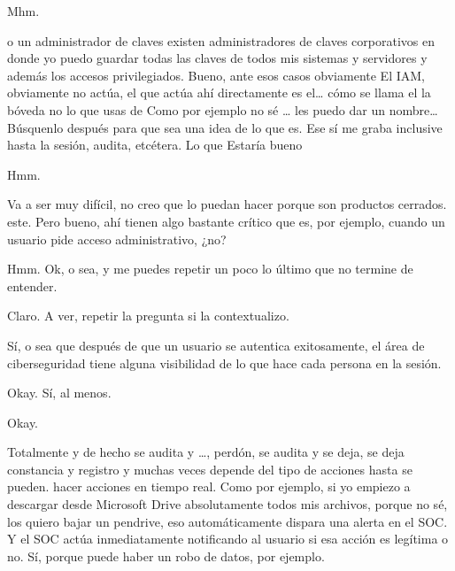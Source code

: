 \begin{description}[leftmargin=0cm, labelsep=0.5cm]
    \item[\textbf{MOCIULSKY SANTIAGO:}] Mhm.

    \item[\textbf{PEÑA ALEJANDRO FRANCISCO:}] o un administrador de claves existen administradores de claves corporativos en donde yo puedo guardar todas las claves de todos mis sistemas y servidores y además los accesos privilegiados. Bueno, ante esos casos obviamente El IAM, obviamente no actúa, el que actúa ahí directamente es el… cómo se llama el la bóveda no lo que usas de Como por ejemplo no sé … les puedo dar un nombre… Búsquenlo después para que sea una idea de lo que es. Ese sí me graba inclusive hasta la sesión, audita, etcétera. Lo que Estaría bueno

    \item[\textbf{MOCIULSKY SANTIAGO:}] Hmm.

    \item[\textbf{PEÑA ALEJANDRO FRANCISCO:}] Va a ser muy difícil, no creo que lo puedan hacer porque son productos cerrados. este. Pero bueno, ahí tienen algo bastante crítico que es, por ejemplo, cuando un usuario pide acceso administrativo, ¿no?

    \item[\textbf{MOCIULSKY SANTIAGO:}] Hmm. Ok, o sea, y me puedes repetir un poco lo último que no termine de entender.

    \item[\textbf{PEÑA ALEJANDRO FRANCISCO:}] Claro. A ver, repetir la pregunta si la contextualizo.

    \item[\textbf{MOCIULSKY SANTIAGO:}] Sí, o sea que después de que un usuario se autentica exitosamente, el área de ciberseguridad tiene alguna visibilidad de lo que hace cada persona en la sesión.

    \item[\textbf{PEÑA ALEJANDRO FRANCISCO:}] Okay. Sí, al menos.

    \item[\textbf{MOCIULSKY SANTIAGO:}] Okay.

    \item[\textbf{PEÑA ALEJANDRO FRANCISCO:}] Totalmente y de hecho se audita y …, perdón, se audita y se deja, se deja constancia y registro y muchas veces depende del tipo de acciones hasta se pueden. hacer acciones en tiempo real. Como por ejemplo, si yo empiezo a descargar desde Microsoft Drive absolutamente todos mis archivos, porque no sé, los quiero bajar un pendrive, eso automáticamente dispara una alerta en el SOC. Y el SOC actúa inmediatamente notificando al usuario si esa acción es legítima o no. Sí, porque puede haber un robo de datos, por ejemplo.


\end{description}
